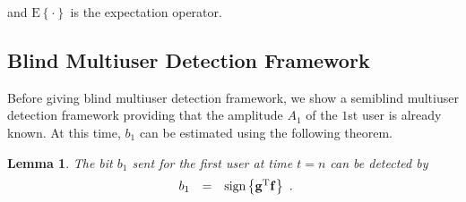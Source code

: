 \documentclass[a4paper,11pt,fleqn]{article}
\newtheorem{lemma}{Lemma}
\newcommand{\bg}{{\bf g}}
\newcommand{\bbf}{{\bf f}}
\begin{document}
\noindent and $\mbox{E}\left\{\cdot\right\}$ is the expectation
operator.


\subsection{Blind Multiuser Detection Framework} Before giving
blind multiuser detection framework, we show a semiblind multiuser
detection framework providing that the amplitude $A_1$ of the
$1$st user is already known. At this time, $b_1$ can be estimated
using the following theorem.


\begin{lemma}
The bit $b_1$ sent for the first user at time $t=n$ can be
detected by
\begin{equation}
\begin{array}{rcl}
b_1 &=& \mbox{sign}\left\{\bg^{\rm T}\bbf\right\}
\end{array}.
\end{equation} \label{bn_estimation}
\end{lemma}
\end{document}
